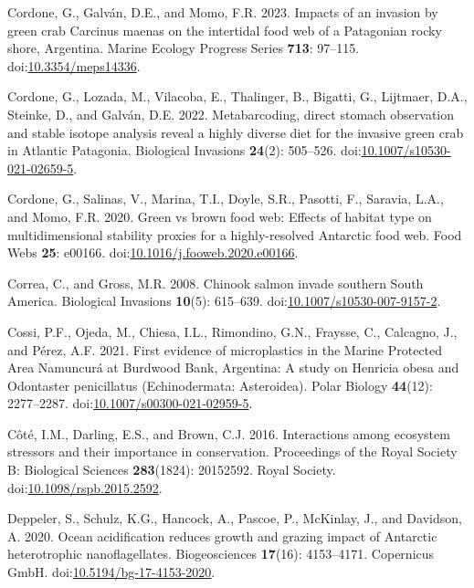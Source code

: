 \documentclass[
]{article}
\newlength{\cslhangindent}
\newenvironment{CSLReferences}[2] %
 {\begin{list}{}{%
  \setlength{\itemindent}{0pt}
  \setlength{\leftmargin}{0pt}
  \setlength{\parsep}{0pt}
  \ifodd #1
   \setlength{\leftmargin}{\cslhangindent}
   \setlength{\itemindent}{-1\cslhangindent}
  \fi
  \setlength{\itemsep}{#2\baselineskip}}}
 {\end{list}}
\begin{document}
\begin{CSLReferences}{1}{0}
Cordone, G., Galván, D.E., and Momo, F.R. 2023. Impacts of an invasion
by green crab {Carcinus} maenas on the intertidal food web of a
{Patagonian} rocky shore, {Argentina}. Marine Ecology Progress Series
\textbf{713}: 97--115.
doi:\href{https://doi.org/10.3354/meps14336}{10.3354/meps14336}.

Cordone, G., Lozada, M., Vilacoba, E., Thalinger, B., Bigatti, G.,
Lijtmaer, D.A., Steinke, D., and Galván, D.E. 2022. Metabarcoding,
direct stomach observation and stable isotope analysis reveal a highly
diverse diet for the invasive green crab in {Atlantic Patagonia}.
Biological Invasions \textbf{24}(2): 505--526.
doi:\href{https://doi.org/10.1007/s10530-021-02659-5}{10.1007/s10530-021-02659-5}.

Cordone, G., Salinas, V., Marina, T.I., Doyle, S.R., Pasotti, F.,
Saravia, L.A., and Momo, F.R. 2020. Green vs brown food web: {Effects}
of habitat type on multidimensional stability proxies for a
highly-resolved {Antarctic} food web. Food Webs \textbf{25}: e00166.
doi:\href{https://doi.org/10.1016/j.fooweb.2020.e00166}{10.1016/j.fooweb.2020.e00166}.

Correa, C., and Gross, M.R. 2008. Chinook salmon invade southern {South
America}. Biological Invasions \textbf{10}(5): 615--639.
doi:\href{https://doi.org/10.1007/s10530-007-9157-2}{10.1007/s10530-007-9157-2}.

Cossi, P.F., Ojeda, M., Chiesa, I.L., Rimondino, G.N., Fraysse, C.,
Calcagno, J., and Pérez, A.F. 2021. First evidence of microplastics in
the {Marine Protected Area Namuncur{á}} at {Burdwood Bank}, {Argentina}:
A study on {Henricia} obesa and {Odontaster} penicillatus
({Echinodermata}: {Asteroidea}). Polar Biology \textbf{44}(12):
2277--2287.
doi:\href{https://doi.org/10.1007/s00300-021-02959-5}{10.1007/s00300-021-02959-5}.

Côté, I.M., Darling, E.S., and Brown, C.J. 2016. Interactions among
ecosystem stressors and their importance in conservation. Proceedings of
the Royal Society B: Biological Sciences \textbf{283}(1824): 20152592.
Royal Society.
doi:\href{https://doi.org/10.1098/rspb.2015.2592}{10.1098/rspb.2015.2592}.

Deppeler, S., Schulz, K.G., Hancock, A., Pascoe, P., McKinlay, J., and
Davidson, A. 2020. Ocean acidification reduces growth and grazing impact
of {Antarctic} heterotrophic nanoflagellates. Biogeosciences
\textbf{17}(16): 4153--4171. Copernicus GmbH.
doi:\href{https://doi.org/10.5194/bg-17-4153-2020}{10.5194/bg-17-4153-2020}.


\end{CSLReferences}
\end{document}

